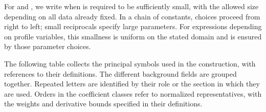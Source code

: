 \begin{definition}\label{def:3.3}
For  and , we write
 when  is required to be sufficiently small, with the allowed size depending on
all data already fixed. In a chain of constants, choices proceed from right to left; small
reciprocals specify large parameters. For expressions depending on profile variables, this
smallness is uniform on the stated domain and is ensured by those parameter choices.
\end{definition}

The following table collects the principal symbols used in the construction, with references
to their definitions. The different background fields are grouped together. Repeated letters
are identified by their role or the section in which they are used. Orders in the coefficient
classes refer to normalized representatives, with the weights and derivative bounds specified
in their definitions.
